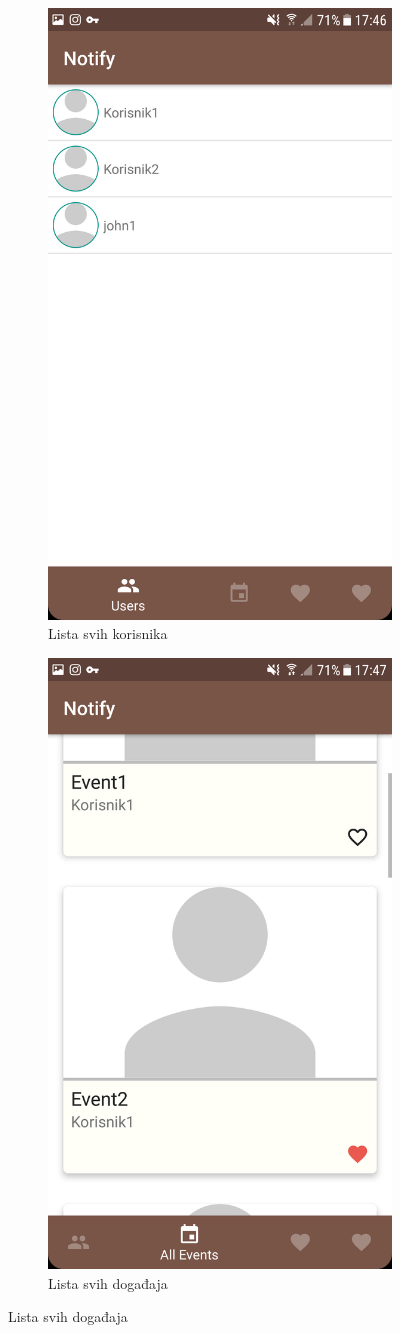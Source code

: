 \documentclass[times, utf8, zavrsni]{fer}
\begin{document}
\begin{figure}
\centering

\begin{subfigure}{0.5\linewidth}
	\centering
    \includegraphics[width=0.45\linewidth]{img/ss-user-list.png} 
    \caption{Lista svih korisnika}
    \label{fig:user-list-image}
\end{subfigure}%
\begin{subfigure}{0.5\linewidth}
 	\centering
    \includegraphics[width=0.45\linewidth]{img/ss-event-list-all.png} 
    \caption{Lista svih događaja}
    \label{fig:event-list-all-image}
\end{subfigure}

\end{figure}
\end{document}
